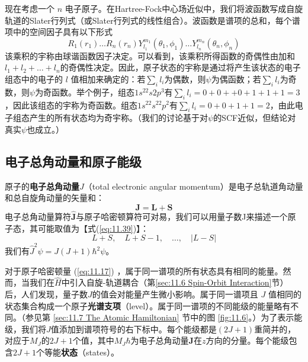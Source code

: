     现在考虑一个 $n$ 电子原子。在Hartree-Fock中心场近似中，我们将波函数写成自旋轨道的Slater行列式（或Slater行列式的线性组合）。波函数是谱项的总和，每个谱项中的空间因子具有以下形式
    \begin{equation*}
        R_1(r_1) \ldots R_n(r_n) Y_{l_1}^{m_1}(\theta_1, \phi_1) \ldots Y_{l_n}^{m_n}(\theta_n, \phi_n)
    \end{equation*}
    该乘积的宇称由球谐函数因子决定。可以看到，该乘积所得函数的奇偶性由加和$l_1+l_2+\ldots+l_n$的奇偶性决定。因此，原子状态的宇称是通过将产生该状态的电子组态中的电子的 $l$ 值相加来确定的：若$\sum_il_i$为偶数，则$\psi$为偶函数；若$\sum_il_i$为奇数，则$\psi$为奇函数。举个例子，组态$1s^22s2p^3$有$\sum_il_i = 0 + 0 + +0 + 1 + 1 + 1 = 3$，因此该组态的宇称为奇函数。组态$1s^22s^22p^2$有$\sum_il_i = 0 + 0 + 1 + 1 = 2$，由此电子组态产生的所有状态均为奇宇称。（我们的讨论基于对$\psi$的SCF近似，但结论对真实$\psi$也成立。）

\subsection*{电子总角动量和原子能级}

    原子的\textbf{电子总角动量$J$}（total electronic angular momentum）是电子总轨道角动量和总自旋角动量的矢量和：
    \begin{equation}
        \boxed{
            \mathbf{J} = \mathbf{L} + \mathbf{S}
        }
        \label{eq:11.61}
    \end{equation}
    电子总角动量算符$\hat{\mathbf{J}}$与原子哈密顿算符可对易，我们可以用量子数J来描述一个原子态，其可能取值为【式(\ref{eq:11.39})】：
    \begin{equation}
        L+S, \quad L+S-1, \quad \ldots, \quad |L-S|
        \label{eq:11.62}
    \end{equation}
    我们有$\hat{J}^2\psi = J\left(J+1\right)\hbar^2\psi$。

    对于原子哈密顿量  (\ref{eq:11.17}) ，属于同一谱项的所有状态具有相同的能量。然而，当我们在$\hat{H}$中引入自旋-轨道耦合（第\ref{sec:11.6 Spin-Orbit Interaction}节）后，人们发现，量子数$J$的值会对能量产生微小影响。属于同一谱项且 $J$ 值相同的状态集合构成一个原子\textbf{光谱支项}（level）。属于同一谱项的不同能级的能量略有不同。（参见第 \ref{sec:11.7 The Atomic Hamiltonian} 节中的图 \ref{fig:11.6}。）为了表示能级，我们将$J$值添加到谱项符号的右下标中。每个能级都是$\left(2J+1\right)$重简并的，对应于$M_J$的$2J+1$个值，其中$M_J\hbar$为电子总角动量$\mathbf{J}$在$z$方向的分量。每个能级包含$2J+1$个等能\textbf{状态}（states）。

